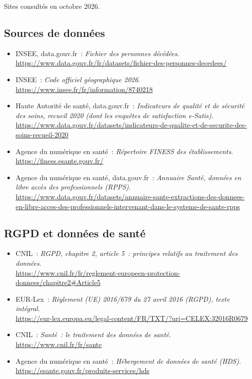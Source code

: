 \noindent Sites consultés en octobre 2026.

\subsection*{Sources de données}
\begin{itemize}
	\item INSEE, data.gouv.fr~: \textit{Fichier des personnes décédées}.\\ \url{https://www.data.gouv.fr/fr/datasets/fichier-des-personnes-decedees/}
	\item INSEE~: \textit{Code officiel géographique 2026}.\\ \url{https://www.insee.fr/fr/information/8740218}
	\item Haute Autorité de santé, data.gouv.fr~: \textit{Indicateurs de qualité et de sécurité des soins, recueil 2020 (dont les enquêtes de satisfaction e-Satis)}.\\ \url{https://www.data.gouv.fr/datasets/indicateurs-de-qualite-et-de-securite-des-soins-recueil-2020}
	\item Agence du numérique en santé~: \textit{Répertoire FINESS des établissements}.\\ \url{https://finess.esante.gouv.fr/}
	\item Agence du numérique en santé, data.gouv.fr~: \textit{Annuaire Santé, données en libre accès des professionnels (RPPS)}.\\ \url{https://www.data.gouv.fr/datasets/annuaire-sante-extractions-des-donnees-en-libre-acces-des-professionnels-intervenant-dans-le-systeme-de-sante-rpps}
\end{itemize}

\subsection*{RGPD et données de santé}
\begin{itemize}
	\item CNIL~: \textit{RGPD, chapitre 2, article 5~: principes relatifs au traitement des données}.\\ \url{https://www.cnil.fr/fr/reglement-europeen-protection-donnees/chapitre2#Article5}
	\item EUR-Lex~: \textit{Règlement (UE) 2016/679 du 27 avril 2016 (RGPD), texte intégral}.\\ \url{https://eur-lex.europa.eu/legal-content/FR/TXT/?uri=CELEX:32016R0679}
	\item CNIL~: \textit{Santé~: le traitement des données de santé}.\\ \url{https://www.cnil.fr/fr/sante}
	\item Agence du numérique en santé~: \textit{Hébergement de données de santé (HDS)}.\\ \url{https://esante.gouv.fr/produits-services/hds}
\end{itemize}

